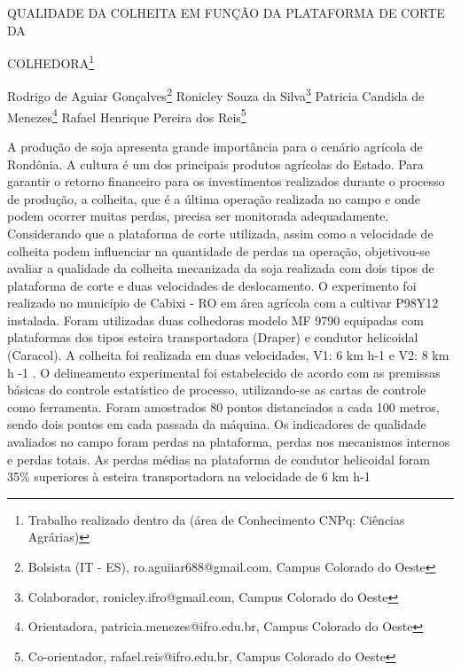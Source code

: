 \documentclass[article,12pt,onesidea,4paper,english,brazil]{abntex2}
\begin{document}
	
	
	\frenchspacing 
	
	\begin{center}
		\LARGE QUALIDADE DA COLHEITA EM FUNÇÃO DA PLATAFORMA DE CORTE DA
		
		COLHEDORA\footnote{Trabalho realizado dentro da (área de Conhecimento CNPq: Ciências Agrárias)}
		
		\normalsize
		Rodrigo de Aguiar Gonçalves\footnote{Bolsista (IT - ES), ro.aguiiar688@gmail.com, Campus Colorado do Oeste} 
		Ronicley Souza da Silva\footnote{Colaborador, ronicley.ifro@gmail.com, Campus Colorado do Oeste} 
		Patricia Candida de Menezes\footnote{Orientadora, patricia.menezes@ifro.edu.br, Campus Colorado do Oeste} 
		Rafael
		Henrique Pereira dos Reis\footnote{Co-orientador, rafael.reis@ifro.edu.br, Campus Colorado do Oeste} 
	\end{center}
	
	\noindent A produção de soja apresenta grande importância para o cenário agrícola de
	Rondônia. A cultura é um dos principais produtos agrícolas do Estado. Para garantir
	o retorno financeiro para os investimentos realizados durante o processo de
	produção, a colheita, que é a última operação realizada no campo e onde podem
	ocorrer muitas perdas, precisa ser monitorada adequadamente. Considerando que a
	plataforma de corte utilizada, assim como a velocidade de colheita podem influenciar
	na quantidade de perdas na operação, objetivou-se avaliar a qualidade da colheita
	mecanizada da soja realizada com dois tipos de plataforma de corte e duas
	velocidades de deslocamento. O experimento foi realizado no município de Cabixi -
	RO em área agrícola com a cultivar P98Y12 instalada. Foram utilizadas duas
	colhedoras modelo MF 9790 equipadas com plataformas dos tipos esteira
	transportadora (Draper) e condutor helicoidal (Caracol). A colheita foi realizada em
	duas velocidades, V1: 6 km h-1 e V2: 8 km h
	-1
	. O delineamento experimental foi
	estabelecido de acordo com as premissas básicas do controle estatístico de
	processo, utilizando-se as cartas de controle como ferramenta. Foram amostrados
	80 pontos distanciados a cada 100 metros, sendo dois pontos em cada passada da
	máquina. Os indicadores de qualidade avaliados no campo foram perdas na
	plataforma, perdas nos mecanismos internos e perdas totais. As perdas médias na
	plataforma de condutor helicoidal foram 35\% superiores à esteira transportadora na
	velocidade de 6 km h-1
	
\end{document}
